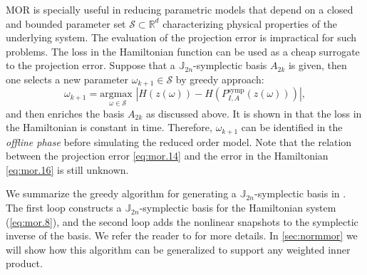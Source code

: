 MOR is specially useful in reducing parametric models that depend on a closed and bounded parameter set $\mathcal{S} \subset \mathbb R^{d}$ characterizing physical properties of the underlying system. The evaluation of the projection error is impractical for such problems. The loss in the Hamiltonian function can be used as a cheap surrogate to the projection error. Suppose that a $\mathbb J_{2n}$-symplectic basis $A_{2k}$ is given, then one selects a new parameter $\omega_{k+1} \in \mathcal{S}$ by greedy approach:
\begin{equation} \label{eq:mor.16}
	\omega_{k+1} = \underset{\omega \in \mathcal{S}}{\text{argmax } } | H(z(\omega)) - H(P^\text{symp}_{I,A}(z(\omega))) |,
\end{equation}
and then enriches the basis $A_{2k}$ as discussed above. It is shown in \cite{doi:10.1137/17M1111991} that the loss in the Hamiltonian is constant in time. Therefore, $\omega_{k+1}$ can be identified in the \emph{offline phase} before simulating the reduced order model. Note that the relation between the projection error \cref{eq:mor.14} and the error in the Hamiltonian \cref{eq:mor.16} is still unknown.

We summarize the greedy algorithm for generating a $\mathbb J_{2n}$-symplectic basis in . The first loop constructs a $\mathbb J_{2n}$-symplectic basis for the Hamiltonian system (\ref{eq:mor.8}), and the second loop adds the nonlinear snapshots to the symplectic inverse of the basis. We refer the reader to \cite{doi:10.1137/17M1111991} for more details. In \cref{sec:normmor} we will show how this algorithm can be generalized to support any weighted inner product.

